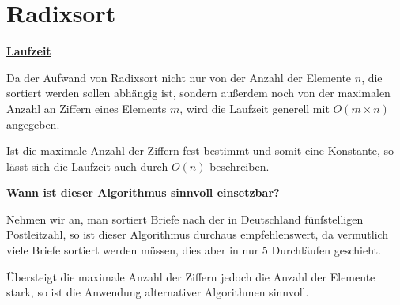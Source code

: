 \documentclass[a4paper]{report}
\begin{document}
\chapter*{Radixsort}

\underline{\bf{Laufzeit}}

Da der Aufwand von Radixsort nicht nur von der Anzahl der Elemente $n$, die sortiert werden sollen abhängig ist, sondern außerdem noch von der maximalen Anzahl an Ziffern eines Elements $m$, wird die Laufzeit generell mit $O(m \times n)$ angegeben.

Ist die maximale Anzahl der Ziffern fest bestimmt und somit eine Konstante, so lässt sich die Laufzeit auch durch $O(n)$ beschreiben. 

\underline{\bf{Wann ist dieser Algorithmus sinnvoll einsetzbar?}}

Nehmen wir an, man sortiert Briefe nach der in Deutschland fünfstelligen Postleitzahl, so ist dieser Algorithmus durchaus empfehlenswert, da vermutlich viele Briefe sortiert werden müssen, dies aber in nur 5 Durchläufen geschieht. 

Übersteigt die maximale Anzahl der Ziffern jedoch die Anzahl der Elemente stark, so ist die Anwendung alternativer Algorithmen sinnvoll.
\end{document}
